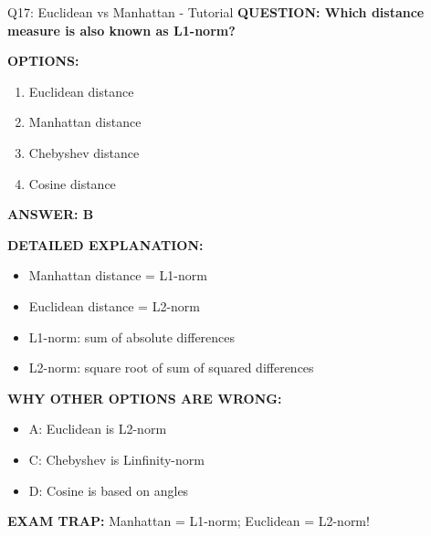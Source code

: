 \documentclass[8pt]{beamer}
\begin{document}
	\begin{frame}{Q17: Euclidean vs Manhattan - Tutorial}
		\fontsize{6.5}{7.5}\selectfont
		\textbf{QUESTION: Which distance measure is also known as L1-norm?}
		
		\vspace{0.1cm}
		\textbf{OPTIONS:}
		\begin{enumerate}
			\item Euclidean distance
			\item Manhattan distance
			\item Chebyshev distance
			\item Cosine distance
		\end{enumerate}
		
		\vspace{0.1cm}
		\textcolor{myblue}{\textbf{ANSWER: B}}
		
		\vspace{0.1cm}
		\textbf{DETAILED EXPLANATION:}
		\begin{itemize}
			\item Manhattan distance = L1-norm
			\item Euclidean distance = L2-norm
			\item L1-norm: sum of absolute differences
			\item L2-norm: square root of sum of squared differences
		\end{itemize}
		
		\vspace{0.1cm}
		\textcolor{myred}{\textbf{WHY OTHER OPTIONS ARE WRONG:}}
		\begin{itemize}
			\item \textcolor{myred}{A:} Euclidean is L2-norm
			\item \textcolor{myred}{C:} Chebyshev is Linfinity-norm
			\item \textcolor{myred}{D:} Cosine is based on angles
		\end{itemize}
		
		\textcolor{myred}{\textbf{EXAM TRAP:}} Manhattan = \textcolor{myblue}{L1-norm}; Euclidean = \textcolor{myblue}{L2-norm}!
	\end{frame}
	
\end{document}
